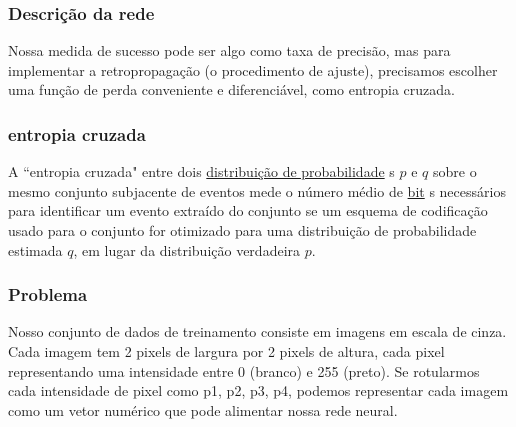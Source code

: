 \begin{frame}
\frametitle{Descrição da rede}

Nossa medida de sucesso pode ser algo como taxa de precisão, mas para
    implementar a retropropagação (o procedimento de ajuste), precisamos
    escolher uma função de perda conveniente e diferenciável, como entropia
    cruzada.

\end{frame}

\begin{frame}
\frametitle{entropia cruzada}
A ``entropia cruzada"  entre dois
    \href{distribuição_de_probabilidade}{distribuição de probabilidade} s
    \(p\) e \(q\) sobre o mesmo conjunto subjacente de eventos mede o número
    médio de \url{bit} s necessários para identificar um evento extraído do
    conjunto se um esquema de codificação usado para o conjunto for otimizado
    para uma distribuição de probabilidade estimada \(q\), em lugar da
    distribuição verdadeira \(p\).

\end{frame}


\begin{frame}
\frametitle{Problema}
Nosso conjunto de dados de treinamento consiste em imagens em escala de cinza.
Cada imagem tem 2 pixels de largura por 2 pixels de altura, cada pixel
representando uma intensidade entre 0 (branco) e 255 (preto). Se rotularmos
cada intensidade de pixel como p1, p2, p3, p4, podemos representar cada imagem
como um vetor numérico que pode alimentar nossa rede neural.
\end{frame}


